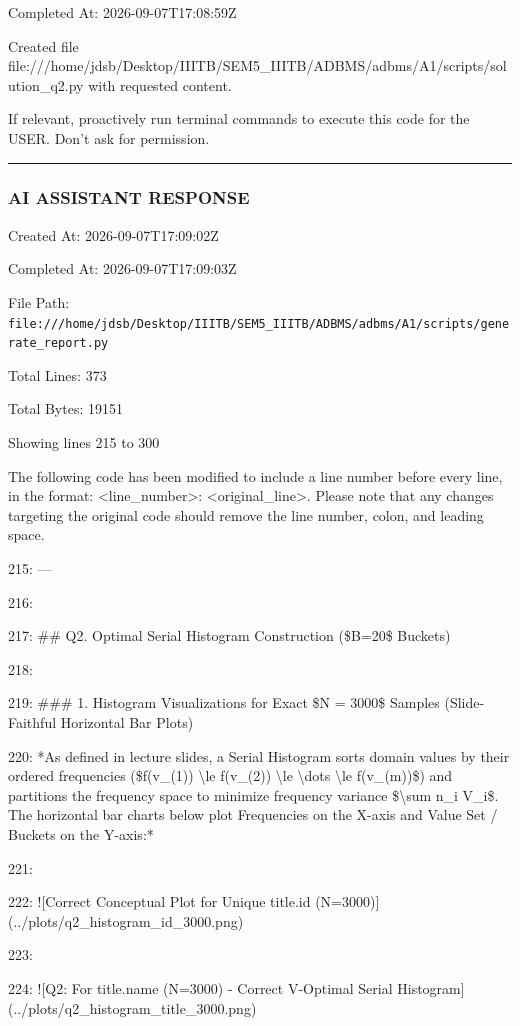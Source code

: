 \documentclass[11pt,a4paper]{article}
\begin{document}
Completed At: 2026-09-07T17:08:59Z

Created file file:///home/jdsb/Desktop/IIITB/SEM5\_IIITB/ADBMS/adbms/A1/scripts/solution\_q2.py with requested content.

If relevant, proactively run terminal commands to execute this code for the USER. Don't ask for permission.


\hrule

\subsubsection{AI ASSISTANT RESPONSE}

Created At: 2026-09-07T17:09:02Z

Completed At: 2026-09-07T17:09:03Z

File Path: \texttt{file:///home/jdsb/Desktop/IIITB/SEM5\_IIITB/ADBMS/adbms/A1/scripts/generate\_report.py}

Total Lines: 373

Total Bytes: 19151

Showing lines 215 to 300

The following code has been modified to include a line number before every line, in the format: <line\_number>: <original\_line>. Please note that any changes targeting the original code should remove the line number, colon, and leading space.

215: ---

216:

217: \#\# Q2. Optimal Serial Histogram Construction (\$B=20\$ Buckets)

218:

219: \#\#\# 1. Histogram Visualizations for Exact \$N = 3000\$ Samples (Slide-Faithful Horizontal Bar Plots)

220: *As defined in lecture slides, a Serial Histogram sorts domain values by their ordered frequencies (\$f(v\_{{(1)}}) \textbackslash{}le f(v\_{{(2)}}) \textbackslash{}le \textbackslash{}dots \textbackslash{}le f(v\_{{(m)}})\$) and partitions the frequency space to minimize frequency variance \$\textbackslash{}sum n\_i V\_i\$. The horizontal bar charts below plot Frequencies on the X-axis and Value Set / Buckets on the Y-axis:*

221:

222: ![Correct Conceptual Plot for Unique title.id (N=3000)](../plots/q2\_histogram\_id\_3000.png)

223:

224: ![Q2: For title.name (N=3000) - Correct V-Optimal Serial Histogram](../plots/q2\_histogram\_title\_3000.png)
\end{document}
